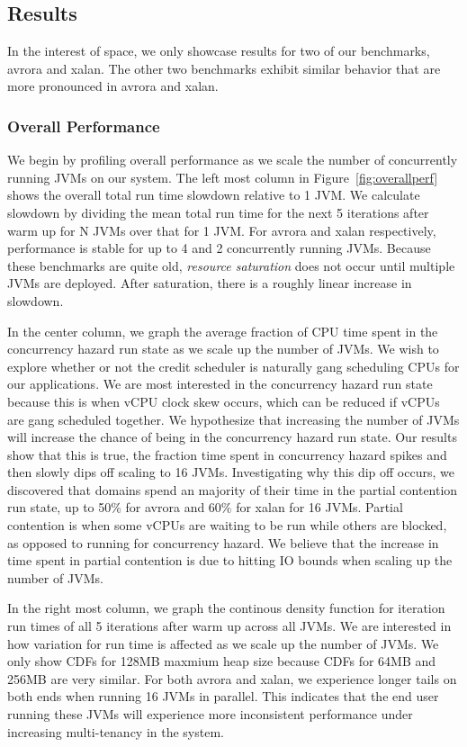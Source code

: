 \documentclass{sig-alternate}
\begin{document}
\subsection{Results}
In the interest of space, we only showcase results for two of our benchmarks, avrora and xalan. The other two benchmarks exhibit similar behavior that are more pronounced in avrora and xalan.

\subsubsection{Overall Performance}
We begin by profiling overall performance as we scale the number of concurrently running JVMs on our system. The left most column in Figure~\ref{fig:overallperf} shows the overall total run time slowdown relative to 1 JVM. We calculate slowdown by dividing the mean total run time for the next 5 iterations after warm up for N JVMs over that for 1 JVM. For avrora and xalan respectively, performance is stable for up to 4 and 2 concurrently running JVMs. Because these benchmarks are quite old, \textit{resource saturation} does not occur until multiple JVMs are deployed. After saturation, there is a roughly linear increase in slowdown.

In the center column, we graph the average fraction of CPU time spent in the concurrency hazard run state as we scale up the number of JVMs. We wish to explore whether or not the credit scheduler is naturally gang scheduling CPUs for our applications. We are most interested in the concurrency hazard run state because this is when vCPU clock skew occurs, which can be reduced if vCPUs are gang scheduled together. We hypothesize that increasing the number of JVMs will increase the chance of being in the concurrency hazard run state. Our results show that this is true, the fraction time spent in concurrency hazard spikes and then slowly dips off scaling to 16 JVMs. Investigating why this dip off occurs, we discovered that domains spend an majority of their time in the partial contention run state, up to 50\% for avrora and 60\% for xalan for 16 JVMs. Partial contention is when some vCPUs are waiting to be run while others are blocked, as opposed to running for concurrency hazard. We believe that the increase in time spent in partial contention is due to hitting IO bounds when scaling up the number of JVMs.

In the right most column, we graph the continous density function for iteration run times of all 5 iterations after warm up across all JVMs. We are interested in how variation for run time is affected as we scale up the number of JVMs. We only show CDFs for 128MB maxmium heap size because CDFs for 64MB and 256MB are very similar. For both avrora and xalan, we experience longer tails on both ends when running 16 JVMs in parallel. This indicates that the end user running these JVMs will experience more inconsistent performance under increasing multi-tenancy in the system. 
\end{document}
